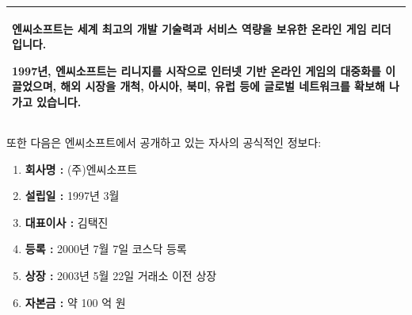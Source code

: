 \documentclass[11pt]{oblivoir}
\newenvironment{textbox}
	{
	\begin{center}
		\begin{tabular}{|p{0.95\textwidth}|}
			\hline
	}
	{
		\\ \hline
		\end{tabular}
		\end{center}
	}
\begin{document}
		\begin{textbox}
			엔씨소프트는 세계 최고의 개발 기술력과 서비스 역량을 보유한 온라인 게임 리더입니다.
			
			1997년, 엔씨소프트는 리니지를 시작으로 인터넷 기반 온라인 게임의 대중화를 이끌었으며, 해외 시장을 개척, 아시아, 북미, 유럽 등에 글로벌 네트워크를 확보해 나가고 있습니다.
		\end{textbox} 
		\pagebreak
		
		\noindent 또한 다음은 엔씨소프트에서 공개하고 있는 자사의 공식적인 정보다:
		\begin{enumerate}
			\item \textbf{회사명 :} (주)엔씨소프트
			\item \textbf{설립일 :} 1997년 3월
  			\item \textbf{대표이사 :} 김택진
			\item \textbf{등록 :} 2000년 7월 7일 코스닥 등록 
			\item \textbf{상장 :} 2003년 5월 22일 거래소 이전 상장
			\item \textbf{자본금 :} 약 100 억 원
		\end{enumerate}
		
\end{document}
